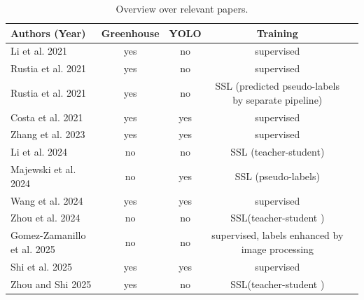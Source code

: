 \documentclass[12pt,a4paper]{article}
\begin{document}
\newpage

\begin{table}[htbp]
\centering
{\footnotesize
\begin{tabularx}{\textwidth}{l c c c l}
\hline
\textbf{Authors (Year)} & \textbf{Greenhouse} & \textbf{YOLO} & \textbf{Training}  \\
\hline

Li et al. 2021 \cite{li_field_2021}
& \cellcolor{green!40}yes & \cellcolor{red!40}no & \cellcolor{red!40} supervised \\

Rustia et al. 2021 \cite{rustia_automatic_2021}
& \cellcolor{green!40}yes & \cellcolor{red!40}no & \cellcolor{red!40} supervised \\

Rustia et al. 2021 \cite{rustia_online_2021}
& \cellcolor{green!40}yes & \cellcolor{red!40}no & \cellcolor{orange!40} SSL (predicted pseudo-labels by separate pipeline)\\

Costa et al. 2021 \cite{costa_intelligent_2023}
& \cellcolor{green!40}yes & \cellcolor{green!40}yes & \cellcolor{red!40} supervised \\

Zhang et al. 2023 \cite{zhang_automatic_2023} 
& \cellcolor{green!40}yes & \cellcolor{green!40}yes & \cellcolor{red!40} supervised \\

Li et al. 2024 \cite{li_mateacher_2024}
& \cellcolor{red!40}no & \cellcolor{red!40}no & \cellcolor{orange!40} SSL (teacher-student) \\

Majewski et al. 2024 \cite{majewski_improved_2024}
& \cellcolor{red!40}no & \cellcolor{green!40}yes & \cellcolor{orange!40} SSL (pseudo-labels) \\

Wang et al. 2024 \cite{wang_deep-learning-based_2024}
& \cellcolor{green!40}yes & \cellcolor{green!40}yes & \cellcolor{red!40} supervised \\

Zhou et al. 2024 \cite{zhou_mutual_2024}
& \cellcolor{red!40}no & \cellcolor{red!40}no & \cellcolor{orange!40} SSL(teacher-student ) \\

Gomez-Zamanillo et al. 2025  \cite{gomez-zamanillo_semi-supervised_2025}
& \cellcolor{red!40}no & \cellcolor{red!40}no & \cellcolor{orange!40} supervised, labels enhanced by image processing \\

Shi et al. 2025 \cite{shi_small_2025}
& \cellcolor{green!40}yes & \cellcolor{green!40}yes & \cellcolor{red!40} supervised \\

Zhou and Shi 2025 \cite{zhou_perceptive_2025} 
& \cellcolor{green!40}yes & \cellcolor{red!40}no & \cellcolor{orange!40} SSL(teacher-student ) \\

\hline
\end{tabularx}
}
\caption{Overview over relevant papers.}
\label{tab:literature-overview}
\end{table}
\end{document}

